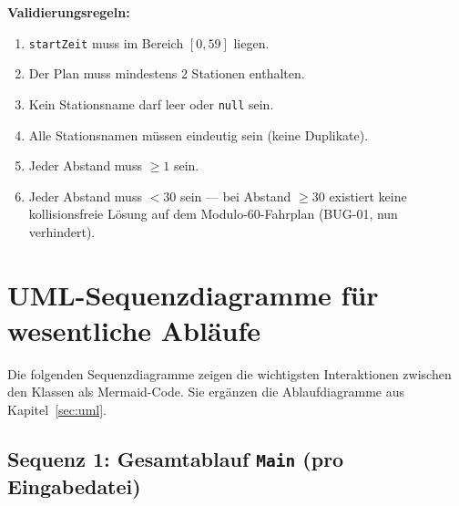 \documentclass[12pt,a4paper]{article}
\begin{document}
\textbf{Validierungsregeln:}
\begin{enumerate}
  \item \texttt{startZeit} muss im Bereich $[0, 59]$ liegen.
  \item Der Plan muss mindestens 2 Stationen enthalten.
  \item Kein Stationsname darf leer oder \texttt{null} sein.
  \item Alle Stationsnamen müssen eindeutig sein (keine Duplikate).
  \item Jeder Abstand muss $\geq 1$ sein.
  \item Jeder Abstand muss $< 30$ sein — bei Abstand $\geq 30$ existiert
        keine kollisionsfreie Lösung auf dem Modulo-60-Fahrplan (BUG-01, nun verhindert).
\end{enumerate}

\section{UML-Sequenzdiagramme für wesentliche Abläufe}
\label{sec:sequenz}

Die folgenden Sequenzdiagramme zeigen die wichtigsten Interaktionen zwischen den
Klassen als Mermaid-Code. Sie ergänzen die Ablaufdiagramme aus Kapitel~\ref{sec:uml}.

\subsection{Sequenz 1: Gesamtablauf \texttt{Main} (pro Eingabedatei)}
\end{document}
